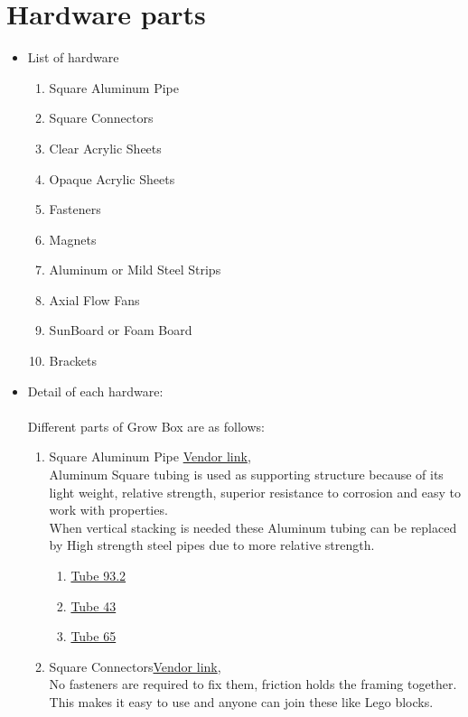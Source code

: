 \documentclass[a4paper,12pt,oneside]{book}
\begin{document}
\section{Hardware parts}
\begin{itemize}
  \item List of hardware
  \begin{enumerate}
  \item Square Aluminum Pipe
  \item Square Connectors
  \item Clear Acrylic Sheets
  \item Opaque Acrylic Sheets
  \item Fasteners
  \item Magnets
  \item Aluminum or Mild Steel Strips
  \item Axial Flow Fans
  \item SunBoard or Foam Board
  \item Brackets
  \end{enumerate}
  \item Detail of each hardware:\\\\
  Different parts of Grow Box are as follows:
   \begin{enumerate}
  \item Square Aluminum Pipe  \href{https://www.justdial.com/Mumbai/Variety-Aluminium-Ghatkopar-West/022P1932129_BZDET}{Vendor link},\\
  Aluminum Square tubing is used as supporting structure because of its light weight, relative strength, superior resistance to corrosion and easy to work with properties.\\
  When vertical stacking is needed these Aluminum tubing can be replaced by High strength steel pipes due to more relative strength.
  \begin{enumerate}
  \item \href{http://a360.co/2sqg5SJ}{Tube 93.2}
  \item \href{http://a360.co/2tpFQUh}{Tube 43}   
  \item \href{http://a360.co/2tpFQUh}{Tube 65}   
  \end{enumerate}
  \item Square Connectors\href{https://www.indiamart.com/digitalmetrology/tube-connector.html}{Vendor link},\\
  No fasteners are required to fix them, friction holds the framing together. This makes it easy to use and anyone can join these like Lego blocks.

\end{enumerate}
\end{itemize}
\end{document}
